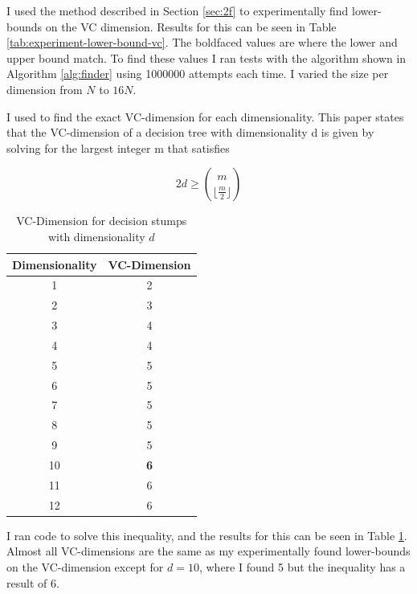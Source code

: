 \documentclass[11pt,a4paper]{article}
\begin{document}
I used the method described in Section \ref{sec:2f} to experimentally find lower-bounds on the VC dimension. Results for this can be seen in Table \ref{tab:experiment-lower-bound-vc}. The boldfaced values are where the lower and upper bound match. To find these values I ran tests with the algorithm shown in Algorithm \ref{alg:finder} using 1000000 attempts each time. I varied the size per dimension from $N$ to $16N$.

I used \cite{decicion-stump-vc-dimension} to find the exact VC-dimension for each dimensionality. This paper states that the VC-dimension of a decision tree with dimensionality d is given by solving for the largest integer m that satisfies

\[ 2d \geq {m \choose \lfloor\frac{m}{2}\rfloor} \]

\begin{table}
    \centering
    \begin{tabular}{|c|c|}
    \hline
    Dimensionality & VC-Dimension \\ \hline
    1              & 2                        \\ \hline
    2              & 3                           \\ \hline
    3              & 4                         \\ \hline
    4              & 4                            \\ \hline
    5              & 5                            \\ \hline
    6              &    5                         \\ \hline
    7              & 5                           \\ \hline
    8              & 5                            \\ \hline
    9              & 5                            \\ \hline
    10              & \textbf{6}                            \\ \hline
    11             &  6                          \\ \hline
    12              &  6                           \\ \hline
    \end{tabular}
    \caption{VC-Dimension for decision stumps with dimensionality $d$}
    \label{tab:vc-dimension}
\end{table}

I ran code to solve this inequality, and the results for this can be seen in Table \ref{tab:vc-dimension}. Almost all VC-dimensions are the same as my experimentally found lower-bounds on the VC-dimension except for $d=10$, where I found 5 but the inequality has a result of 6.





\end{document}
